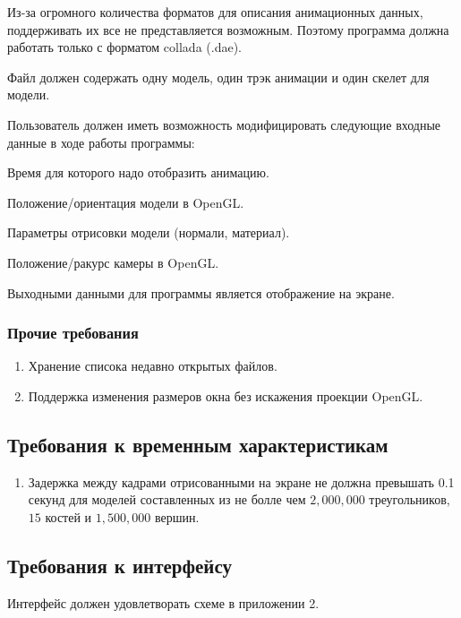 \begin{my_enumerate}
\item Из-за огромного количества форматов для описания анимационных данных, поддерживать их все не представляется возможным. Поэтому программа должна работать только с форматом collada (.dae).
\item Файл должен содержать одну модель, один трэк анимации и один скелет для модели.
\item Пользователь должен иметь возможность модифицировать следующие входные данные в ходе работы программы:
\begin{my_enumerate}
\item Время для которого надо отобразить анимацию.
\item Положение/ориентация модели в OpenGL.
\item Параметры отрисовки модели (нормали, материал).
\item Положение/ракурс камеры в OpenGL.
\end{my_enumerate}
\end{my_enumerate}

\medskip
Выходными данными для программы является отображение на экране.


\subsubsection{Прочие требования}
\begin{enumerate}
\item Хранение списока недавно открытых файлов.
\item Поддержка изменения размеров окна без искажения проекции OpenGL.
\end{enumerate}

\subsection{Требования к временным характеристикам}
\begin{enumerate}
\item Задержка между кадрами отрисованными на экране не должна превышать 0.1 секунд для моделей составленных из не болле чем $2,000,000$ треугольников, $15$ костей и $1,500,000$ вершин.
\end{enumerate}


\subsection{Требования к интерфейсу}
Интерфейс должен удовлетворать схеме в приложении 2.


